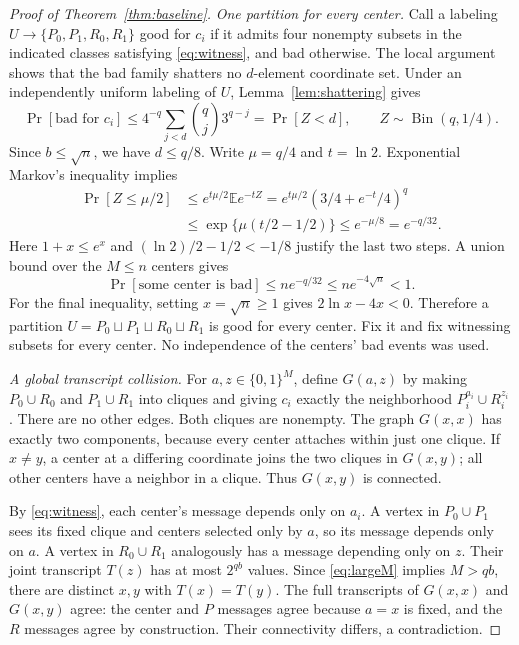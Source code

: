\documentclass[11pt]{article}
\theoremstyle{remark}
\begin{document}
\begin{proof}[Proof of Theorem~\ref{thm:baseline}]
\smallskip
\noindent\emph{One partition for every center.}
Call a labeling $U\to\{P_0,P_1,R_0,R_1\}$ good for $c_i$ if it admits
four nonempty subsets in the indicated classes satisfying
\eqref{eq:witness}, and bad otherwise. The local argument shows that the
bad family shatters no $d$-element coordinate set. Under an independently
uniform labeling of $U$, Lemma~\ref{lem:shattering} gives
\[
 \Pr[\text{bad for }c_i]
 \le4^{-q}\sum_{j<d}\binom qj3^{q-j}
 =\Pr[Z<d],\qquad Z\sim\operatorname{Bin}(q,1/4).
\]
Since $b\le\sqrt n$, we have $d\le q/8$. Write $\mu=q/4$ and
$t=\ln2$. Exponential Markov's inequality implies
\begin{align*}
 \Pr[Z\le\mu/2]
 &\le e^{t\mu/2}\mathbb E e^{-tZ}
 =e^{t\mu/2}(3/4+e^{-t}/4)^q\\
 &\le\exp\{\mu(t/2-1/2)\}
 \le e^{-\mu/8}=e^{-q/32}.
\end{align*}
Here $1+x\le e^x$ and $(\ln2)/2-1/2<-1/8$ justify the last two
steps. A union bound over the $M\le n$ centers gives
\[
 \Pr[\text{some center is bad}]
 \le ne^{-q/32}\le ne^{-4\sqrt n}<1.
\]
For the final inequality, setting $x=\sqrt n\ge1$ gives
$2\ln x-4x<0$. Therefore a partition
$U=P_0\sqcup P_1\sqcup R_0\sqcup R_1$ is good for every center.
Fix it and fix witnessing subsets for every center. No independence of
the centers' bad events was used.

\smallskip
\noindent\emph{A global transcript collision.}
For $a,z\in\{0,1\}^M$, define $G(a,z)$ by making $P_0\cup R_0$ and
$P_1\cup R_1$ into cliques and giving $c_i$ exactly the neighborhood
$P_i^{a_i}\cup R_i^{z_i}$. There are no other edges. Both cliques are
nonempty. The graph $G(x,x)$ has exactly two components, because every
center attaches within just one clique. If $x\ne y$, a center at a
differing coordinate joins the two cliques in $G(x,y)$; all other
centers have a neighbor in a clique. Thus $G(x,y)$ is connected.

By \eqref{eq:witness}, each center's message depends only on $a_i$.
A vertex in $P_0\cup P_1$ sees its fixed clique and centers selected
only by $a$, so its message depends only on $a$. A vertex in
$R_0\cup R_1$ analogously has a message depending only on $z$.
Their joint transcript $T(z)$ has at most $2^{qb}$ values. Since
\eqref{eq:largeM} implies $M>qb$, there are distinct $x,y$ with
$T(x)=T(y)$. The full transcripts of $G(x,x)$ and $G(x,y)$ agree:
the center and $P$ messages agree because $a=x$ is fixed, and the $R$
messages agree by construction. Their connectivity differs, a
contradiction.


\end{proof}
\end{document}
